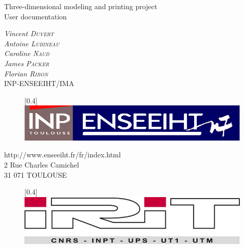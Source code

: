 \documentclass{article}
\begin{document}
\bigskip
\bigskip
\bigskip
\bigskip
\bigskip
\bigskip
\bigskip
\bigskip

\begin{center}
\LARGE{Three-dimensional modeling and printing project\\User documentation \\}
\bigskip
\bigskip\end{center}

\bigskip
\bigskip

\begin{center}
\large{
\textit{Vincent \textsc{Duvert} \\
Antoine \textsc{Lubineau} \\
Caroline \textsc{Naud} \\
James \textsc{Packer} \\
Florian \textsc{Ribon}} \\
\bigskip
INP-ENSEEIHT/IMA 
}
\end{center}

\begin{figure}[!h]
\begin{center}
\scalebox{0.4}[0.4]{\includegraphics{./Images/enseeiht}}
\end{center}
\end{figure}

\bigskip

\begin{center}
http://www.enseeiht.fr/fr/index.html \\
2 Rue Charles Camichel \\
31 071 TOULOUSE
\end{center}

\bigskip

\begin{figure}[!h]
\begin{center}
\scalebox{0.4}[0.4]{\includegraphics{./Images/irit}}
\end{center}
\end{figure}
\end{document}
